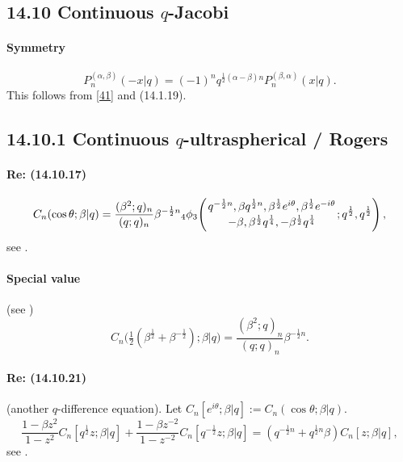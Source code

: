\documentclass[twoside,11pt]{article}
\newcommand\al\alpha
\newcommand\be\beta
\newcommand\tha\theta
\newcommand\half{\frac12}
\newcommand\thalf{\tfrac12}
\newcommand{\qhypK}[5]{ \mbox{}_{#1}\phi_{#2}\!\left(
  \genfrac{}{}{0pt}{}{#3}{#4};#5\right)}
\begin{document}
\subsection*{14.10 Continuous $q$-Jacobi}
\label{sec14.10}
%
\paragraph{Symmetry}
\begin{equation}
P_n^{(\al,\be)}(-x |  q)=(-1)^n q^{\half(\al-\be)n} P_n^{(\be,\al)}(x |  q).
\label{110}
\end{equation}
This follows from \eqref{41} and (14.1.19).
%
\subsection*{14.10.1 Continuous $q$-ultraspherical / Rogers}
\label{sec14.10.1}
\paragraph{Re: (14.10.17)}
\begin{equation}
C_n(\cos\tha;\be |  q)=
\frac{(\be^2;q)_n}{(q;q)_n} \be^{-\half n} 
\qhypK43{q^{-\half n},\be q^{\half n},\be^\half e^{i\tha},\be^\half e^{-i\tha}}
{-\be,\be^\half q^{\frac14},-\be^\half q^{\frac14}}{q^\half,q^\half},
\label{23}
\end{equation}
see .
%
\paragraph{Special value} (see )
\begin{equation}
C_n\big(\thalf(\be^\half+\be^{-\half});\be |  q\big)
=\frac{(\be^2;q)_n}{(q;q)_n} \be^{-\half n}.
\end{equation}
%
\paragraph{Re: (14.10.21)}
(another $q$-difference equation).
Let $C_n[e^{i\tha};\be |  q]:=C_n(\cos\tha;\be |  q)$.
\begin{equation}
\frac{1-\be z^2}{1-z^2} C_n[q^\half z;\be |  q]+
\frac{1-\be z^{-2}}{1-z^{-2}} C_n[q^{-\half}z;\be |  q]=
(q^{-\half n}+q^{\half n} \be) C_n[z;\be |  q],
\label{24}
\end{equation}
see .
%
\end{document}
